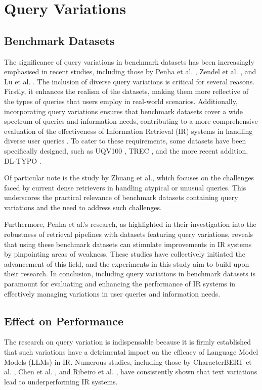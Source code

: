 \section{Query Variations}
\subsection{Benchmark Datasets}
The significance of query variations in benchmark datasets has been increasingly emphasised in recent studies, including those by Penha et al. \cite{penha2022}, Zendel et al. \cite{zendel}, and Lu et al. \cite{lu}. The inclusion of diverse query variations is critical for several reasons. Firstly, it enhances the realism of the datasets, making them more reflective of the types of queries that users employ in real-world scenarios. Additionally, incorporating query variations ensures that benchmark datasets cover a wide spectrum of queries and information needs, contributing to a more comprehensive evaluation of the effectiveness of Information Retrieval (IR) systems in handling diverse user queries \cite{penha2022, characterbert, zendel}. To cater to these requirements, some datasets have been specifically designed, such as UQV100 \cite{uqv}, TREC \cite{trec}, and the more recent addition, DL-TYPO \cite{characterbert}.

Of particular note is the study by Zhuang et al., which focuses on the challenges faced by current dense retrievers in handling atypical or unusual queries. This underscores the practical relevance of benchmark datasets containing query variations and the need to address such challenges.

Furthermore, Penha et al.'s research, as highlighted in their investigation into the robustness of retrieval pipelines with datasets featuring query variations, reveals that using these benchmark datasets can stimulate improvements in IR systems by pinpointing areas of weakness. These studies have collectively initiated the advancement of this field, and the experiments in this study aim to build upon their research. In conclusion, including query variations in benchmark datasets is paramount for evaluating and enhancing the performance of IR systems in effectively managing variations in user queries and information needs.

\subsection{Effect on Performance}
The research on query variation is indispensable because it is firmly established that such variations have a detrimental impact on the efficacy of Language Model Models (LLMs) in IR. Numerous studies, including those by CharacterBERT et al. \cite{characterbert}, Chen et al. \cite{chen}, and Ribeiro et al. \cite{ribeiro}, have consistently shown that text variations lead to underperforming IR systems.

